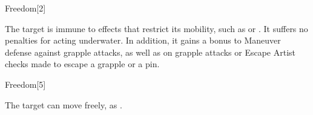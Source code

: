 \begin{spellsection}{Freedom}[2]
    \begin{spellheader}
    \end{spellheader}
    \begin{spellcontent}
        \begin{spelltargetinginfo}
        \end{spelltargetinginfo}
        \begin{spelleffects}
            \spelleffect The target is immune to effects that restrict its mobility, such as  or . It suffers no penalties for acting underwater. In addition, it gains a  bonus to Maneuver defense against grapple attacks, as well as on grapple attacks or Escape Artist checks made to escape a grapple or a pin.
            \spelldur \durshort
        \end{spelleffects}
    \end{spellcontent}
    \begin{spellfooter}
        \miscastrandom
    \end{spellfooter}
\end{spellsection}

\begin{spellsection}[Mass]{Freedom}[5]
    \begin{spellheader}
    \end{spellheader}
    \begin{spellcontent}
        \begin{spelltargetinginfo}
        \end{spelltargetinginfo}
        \begin{spelleffects}
            \spelleffect The target can move freely, as .
            \spelldur \durshort
        \end{spelleffects}
    \end{spellcontent}
    \begin{spellfooter}
        \miscastexplode
    \end{spellfooter}
\end{spellsection}

